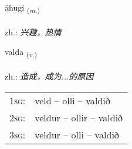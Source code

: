 \documentclass[frontgrid, backgrid]{flacards}\usepackage[]{graphicx}\usepackage[]{xcolor}
\begin{document}
\renewcommand{\flhead}{\vskip5pt \fboxsep=0pt {\small\bfseries\footnotesize Nafnorð | 名词}}
\renewcommand{\fcfoot}{\vskip5pt \fboxsep=0pt \hspace{2pt}{\small\bfseries\footnotesize 1K}}

\renewcommand{\blhead}{\vskip5pt {\small\bfseries\footnotesize Nafnorð | 名词 }}
\renewcommand{\bcfoot}{\vskip5pt \hspace{2pt}{\small\bfseries\footnotesize 1K}}


{áhugi \small{\textsubscript{(\textit{m.})}} \\[1ex] %
\textphonetic{[auːhʏijɪ]} \\
zh.: \emph{兴趣，热情} \\  [2ex]
\renewcommand*{\arraystretch}{0.8}
}

\renewcommand{\flhead}{\vskip5pt \fboxsep=0pt {\small\bfseries\footnotesize Sagnorð | 动词}}
\renewcommand{\fcfoot}{\vskip5pt \fboxsep=0pt \hspace{2pt}{\small\bfseries\footnotesize 1K}}

\renewcommand{\blhead}{\vskip5pt {\small\bfseries\footnotesize Sagnorð | 动词 }}
\renewcommand{\bcfoot}{\vskip5pt \hspace{2pt}{\small\bfseries\footnotesize 1K}}


{valda \small{\textsubscript{(\textit{v.})}} \\[1ex] %
\textphonetic{[valta]} \\
zh.: \emph{造成，成为...的原因} \\  [2ex]
\renewcommand*{\arraystretch}{0.8}
\begin{tabular}{p{1cm}l}
\textsc{1sg}: & veld -- olli -- valdið \\ 
\textsc{2sg}: & veldur -- ollir -- valdið \\ 
\textsc{3sg}: & veldur -- olli -- valdið \\ 
\end{tabular}
}
\end{document}
